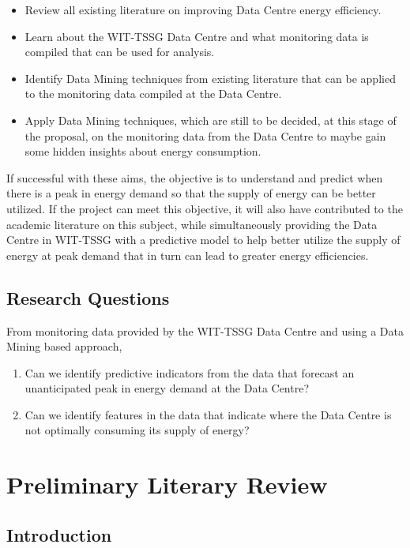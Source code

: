 \documentclass[12pt]{scrartcl}
\begin{document}
\begin{itemize}
\item Review all existing literature on improving Data Centre energy efficiency.
\item Learn about the WIT-TSSG Data Centre and what monitoring data is compiled that can be used for analysis.
\item Identify Data Mining techniques from existing literature that can be applied to the monitoring data compiled at the Data Centre.
\item Apply Data Mining techniques, which are still to be decided, at this stage of the proposal, on the monitoring data from the Data Centre to maybe gain some hidden insights about energy consumption.
\end{itemize}

If successful with these aims, the objective is to understand and predict when there is a peak in energy demand so that the supply of energy can be better utilized.  
If the project can meet this objective, it will also have contributed to the academic literature on this subject, while simultaneously providing the Data Centre in WIT-TSSG with a predictive model to help better utilize the supply of energy at peak demand that in turn can lead to greater energy efficiencies. 
 

\subsection{Research Questions}
\label{subsec:[Research Questions]}

From monitoring data provided by the WIT-TSSG Data Centre and using a Data Mining based approach,
\begin{enumerate}
  \item Can we identify predictive indicators from the data that forecast an unanticipated peak in energy demand at the Data Centre?
  \item Can we identify features in the data that indicate where the Data Centre is not optimally consuming its supply of energy?
\end{enumerate}

\section{Preliminary Literary Review}
\label{sec:[Preliminary Literary Review]}

\subsection{Introduction}
\label{subsec:[Introduction]}
\end{document}
